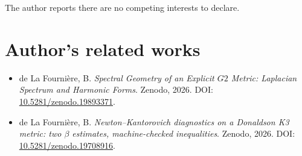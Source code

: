 \documentclass[11pt,a4paper]{article}
\theoremstyle{definition}
\theoremstyle{remark}
\newcommand{\Gtwo}{\mathrm{G}_2}
\def\Gtwo{G2}%
\begin{document}
The author reports there are no competing interests to declare.

\section*{Author's related works}

\begin{itemize}
\item[{[B]}] de La Fourni\`ere, B. \emph{Spectral Geometry of an Explicit $\Gtwo$ Metric: Laplacian Spectrum and Harmonic Forms}. Zenodo, 2026. DOI: \href{https://doi.org/10.5281/zenodo.19893371}{10.5281/zenodo.19893371}.
\item[{[C]}] de La Fourni\`ere, B. \emph{Newton--Kantorovich diagnostics on a Donaldson K3 metric: two $\beta$ estimates, machine-checked inequalities}. Zenodo, 2026. DOI: \href{https://doi.org/10.5281/zenodo.19708916}{10.5281/zenodo.19708916}.
\end{itemize}



\end{document}

